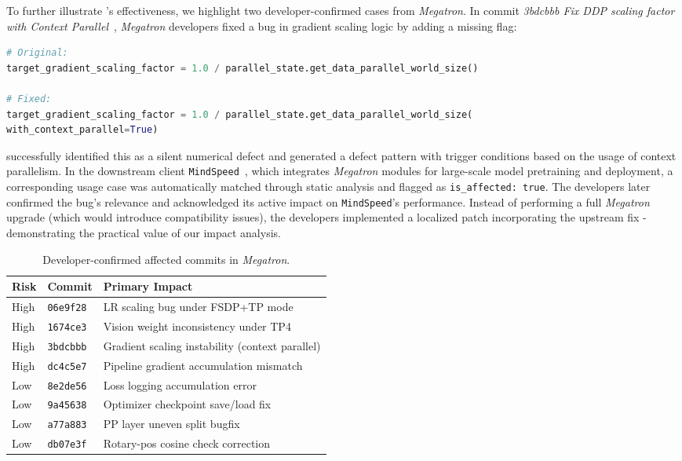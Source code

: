 To further illustrate \appname’s effectiveness, we highlight two developer-confirmed cases from \textit{Megatron}.
In commit \textit{3bdcbbb Fix DDP scaling factor with Context Parallel}~\cite{3bdcbbb}, \textit{Megatron} developers fixed a bug in gradient scaling logic by adding a missing flag:
\begin{lstlisting}[language=Python]
# Original:
target_gradient_scaling_factor = 1.0 / parallel_state.get_data_parallel_world_size()

# Fixed:
target_gradient_scaling_factor = 1.0 / parallel_state.get_data_parallel_world_size(
with_context_parallel=True)
\end{lstlisting}

\appname successfully identified this as a silent numerical defect and generated a defect pattern with trigger conditions based on the usage of context parallelism.
In the downstream client \texttt{MindSpeed}~\cite{mindspeed}, which integrates \textit{Megatron} modules for large-scale model pretraining and deployment, a corresponding usage case was automatically matched through static analysis and flagged as \texttt{is\_affected: true}.
The developers later confirmed the bug's relevance and acknowledged its active impact on \texttt{MindSpeed}'s performance.
Instead of performing a full \textit{Megatron} upgrade (which would introduce compatibility issues), the developers implemented a localized patch incorporating the upstream fix - demonstrating the practical value of our impact analysis.


\begin{table}
\centering
\small
\caption{Developer-confirmed affected commits in \textit{Megatron}.}
\label{tab:rq4-commits}
\begin{tabular}{lll}
\toprule
\textbf{Risk} & \textbf{Commit} & \textbf{Primary Impact} \\
\midrule
High & \texttt{06e9f28}~\cite{06e9f28} & LR scaling bug under FSDP+TP mode \\
High & \texttt{1674ce3}~\cite{1674ce3} & Vision weight inconsistency under TP4 \\
High & \texttt{3bdcbbb}~\cite{3bdcbbb} & Gradient scaling instability (context parallel) \\
High & \texttt{dc4c5e7}~\cite{dc4c5e7} & Pipeline gradient accumulation mismatch \\
\midrule
Low & \texttt{8e2de56}~\cite{8e2de56} & Loss logging accumulation error \\
Low & \texttt{9a45638}~\cite{9a45638} & Optimizer checkpoint save/load fix \\
Low & \texttt{a77a883}~\cite{a77a883} & PP layer uneven split bugfix \\
Low & \texttt{db07e3f}~\cite{db07e3f} & Rotary-pos cosine check correction \\
\bottomrule
\end{tabular}
\vspace{-0.5cm}
\end{table}

